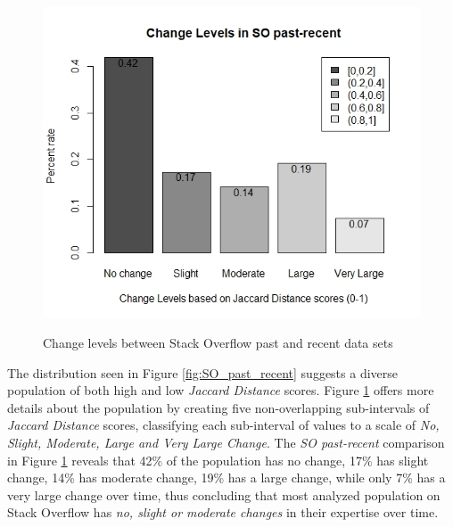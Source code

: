         \begin{figure}
          \centering
          \includegraphics[width=\textwidth]{figures/change_levels_SO_past-recent.jpeg}\\
          \caption{Change levels between Stack Overflow past and recent data sets}
          \label{fig:change_SO_past_recent}
        \end{figure}
        
        The distribution seen in Figure \ref{fig:SO_past_recent} suggests a diverse population of both high and low \emph{Jaccard Distance} scores. Figure \ref{fig:change_SO_past_recent} offers more details about the population by creating five non-overlapping sub-intervals of \emph{Jaccard Distance} scores, classifying each sub-interval of values to a scale of \emph{No, Slight, Moderate, Large and Very Large Change}. The \emph{SO past-recent} comparison in Figure \ref{fig:change_SO_past_recent} reveals that 42\% of the population has no change, 17\% has slight change, 14\% has moderate change, 19\% has a large change, while only 7\% has a very large change over time, thus concluding that most analyzed population on Stack Overflow has \emph{no, slight or moderate changes} in their expertise over time.
        
